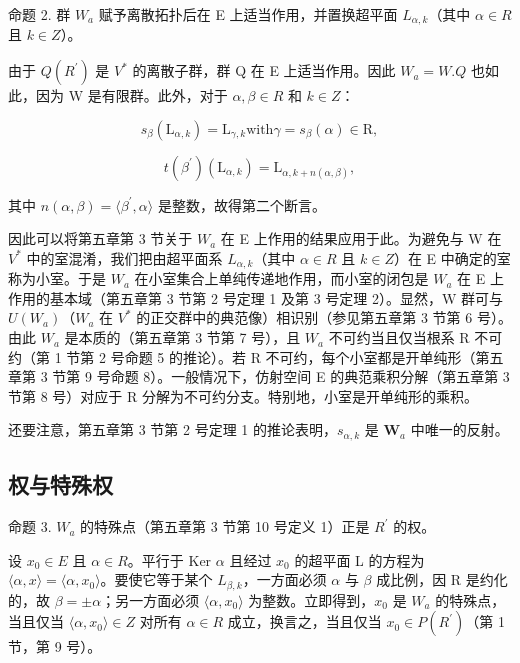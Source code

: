 命题 2. 群 \(W_{a}\) 赋予离散拓扑后在 E 上适当作用，并置换超平面 \(L_{\alpha,k}\)（其中 \(\alpha \in R\) 且 \(k \in Z\)）。

由于 \(Q(R^{\prime})\) 是 \(V^{*}\) 的离散子群，群 Q 在 E 上适当作用。因此 \(W_{a} = W.Q\) 也如此，因为 W 是有限群。此外，对于 \(\alpha, \beta \in R\) 和 \(k \in Z\)：

\[
s _ {\beta} (\mathrm{L} _ {\alpha , k}) = \mathrm{L} _ {\gamma , k} \text {with} \gamma = s _ {\beta} (\alpha) \in \mathrm{R},
\]

\[
t (\beta^ {\prime}) \left(\mathrm{L} _ {\alpha , k}\right) = \mathrm{L} _ {\alpha , k + n (\alpha , \beta)},
\]

其中 \(n(\alpha, \beta) = \langle \beta^{\prime}, \alpha \rangle\) 是整数，故得第二个断言。

因此可以将第五章第 3 节关于 \(W_{a}\) 在 E 上作用的结果应用于此。为避免与 W 在 \(V^{*}\) 中的室混淆，我们把由超平面系 \(L_{\alpha,k}\)（其中 \(\alpha \in R\) 且 \(k \in Z\)）在 E 中确定的室称为小室。于是 \(W_{a}\) 在小室集合上单纯传递地作用，而小室的闭包是 \(W_{a}\) 在 E 上作用的基本域（第五章第 3 节第 2 号定理 1 及第 3 号定理 2）。显然，W 群可与 \(U(W_{a})\)（\(W_{a}\) 在 \(V^{*}\) 的正交群中的典范像）相识别（参见第五章第 3 节第 6 号）。由此 \(W_{a}\) 是本质的（第五章第 3 节第 7 号），且 \(W_{a}\) 不可约当且仅当根系 R 不可约（第 1 节第 2 号命题 5 的推论）。若 R 不可约，每个小室都是开单纯形（第五章第 3 节第 9 号命题 8）。一般情况下，仿射空间 E 的典范乘积分解（第五章第 3 节第 8 号）对应于 R 分解为不可约分支。特别地，小室是开单纯形的乘积。

还要注意，第五章第 3 节第 2 号定理 1 的推论表明，\(s_{\alpha,k}\) 是 \(\mathbf{W}_a\) 中唯一的反射。

\subsection{权与特殊权}

命题 3. \(W_{a}\) 的特殊点（第五章第 3 节第 10 号定义 1）正是 \(R^{\prime}\) 的权。

设 \(x_0 \in E\) 且 \(\alpha \in R\)。平行于 Ker \(\alpha\) 且经过 \(x_0\) 的超平面 L 的方程为 \(\langle \alpha, x \rangle = \langle \alpha, x_0 \rangle\)。要使它等于某个 \(L_{\beta,k}\)，一方面必须 \(\alpha\) 与 \(\beta\) 成比例，因 R 是约化的，故 \(\beta = \pm \alpha\)；另一方面必须 \(\langle \alpha, x_0 \rangle\) 为整数。立即得到，\(x_0\) 是 \(W_a\) 的特殊点，当且仅当 \(\langle \alpha, x_0 \rangle \in Z\) 对所有 \(\alpha \in R\) 成立，换言之，当且仅当 \(x_0 \in P(R^{\prime})\)（第 1 节，第 9 号）。

